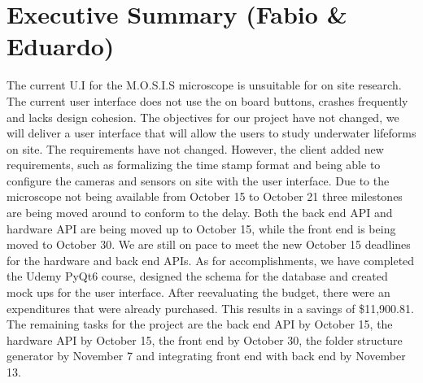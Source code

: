\section*{Executive Summary (Fabio \& Eduardo)}
\begin{spacing}{1.5}

The current U.I for the M.O.S.I.S microscope is unsuitable for on site research. The current user interface does not use the on board buttons, crashes frequently and lacks design cohesion. The objectives for our project have not changed, we will deliver a user interface that will allow the users to study underwater lifeforms on site. The requirements have not changed. However, the client added new requirements, such as formalizing the time stamp format and being able to configure the cameras and sensors on site with the user interface. Due to the microscope not being available from October 15 to October 21  three milestones are being moved around to conform to the delay. Both the back end API and hardware API are being moved up to October 15, while the front end is being moved to October 30. We are still on pace to meet the new October 15 deadlines for the hardware and back end APIs. As for accomplishments, we have completed the Udemy PyQt6 course, designed the schema for the database and created mock ups for the user interface. After reevaluating the budget, there were an expenditures that were already purchased. This results in a savings of \$11,900.81. The remaining tasks for the project are the back end API by October 15, the hardware API by October 15, the front end by October 30, the folder structure generator by November 7 and integrating front end with back end by November 13.
    
\end{spacing}
\newpage